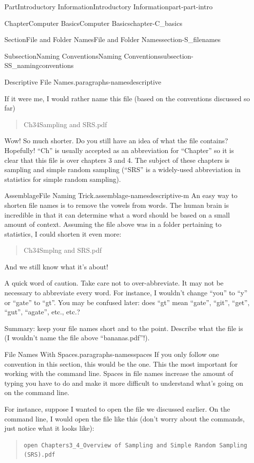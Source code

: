\documentclass[twoside,10pt,]{book}
\newcommand{\mono}[1]{\texttt{#1}}
\begin{document}
\begin{partptx}{Part}{Introductory Information}{}{Introductory Information}{}{}{part-part-intro}
\begin{chapterptx}{Chapter}{Computer Basics}{}{Computer Basics}{}{}{chapter-C_basics}
\begin{sectionptx}{Section}{File and Folder Names}{}{File and Folder Names}{}{}{section-S_filenames}
\begin{subsectionptx}{Subsection}{Naming Conventions}{}{Naming Conventions}{}{}{subsection-SS_namingconventions}
\begin{paragraphs}{Descriptive File Names.}{paragraphs-namesdescriptive}
\par
If it were me, I would rather name this file (based on the conventions discussed so far)%
\begin{quote}%
Ch3\textunderscore{}4\textunderscore{}Sampling and SRS.pdf%
\end{quote}
Wow! So much shorter. Do you still have an idea of what the file contains? Hopefully! ``Ch'' is usually accepted as an abbreviation for ``Chapter'' so it is clear that this file is over chapters 3 and 4. The subject of these chapters is sampling and simple random sampling (``SRS'' is a widely-used abbreviation in statistics for simple random sampling).%
\begin{assemblage}{Assemblage}{File Naming Trick.}{assemblage-namesdescriptive-m}%
An easy way to shorten file names is to remove the vowels from words. The human brain is incredible in that it can determine what a word should be based on a small amount of context. Assuming the file above was in a folder pertaining to statistics, I could shorten it even more:%
\begin{quote}%
Ch3\textunderscore{}4\textunderscore{}Smplng and SRS.pdf%
\end{quote}
And we still know what it's about!%
\par
A quick word of caution. Take care not to over-abbreviate. It may not be necessary to abbreviate every word. For instance, I wouldn't change ``you'' to ``y'' or ``gate'' to ``gt''. You may be confused later: does ``gt'' mean ``gate'', ``git'', ``get'', ``gut'', ``agate'', etc., etc.?%
\end{assemblage}
Summary: keep your file names short and to the point. Describe what the file is (I wouldn't name the file above ``bananas.pdf''!).%
\end{paragraphs}%
\begin{paragraphs}{File Names With Spaces.}{paragraphs-namesspaces}%
%
If you only follow one convention in this section, this would be the one. This the most important for working with the command line. Spaces in file names increase the amount of typing you have to do and make it more difficult to understand what's going on on the command line.%
\par
For instance, suppose I wanted to open the file we discussed earlier. On the command line, I would open the file like this (don't worry about the commands, just notice what it looks like):%
\begin{quote}%
\mono{open \textquotesingle{}Chapters3\_4\_Overview of Sampling and Simple Random Sampling (SRS).pdf\textquotesingle{}}%

\end{quote}
\end{paragraphs}
\end{subsectionptx}
\end{sectionptx}
\end{chapterptx}
\end{partptx}
\end{document}
